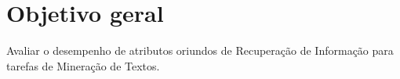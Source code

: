     
    
    
    

    



    \section{Objetivo geral} \label{sec:Objetivo-geral}
        Avaliar o desempenho de atributos oriundos de Recuperação de Informação para tarefas de Mineração de Textos.



